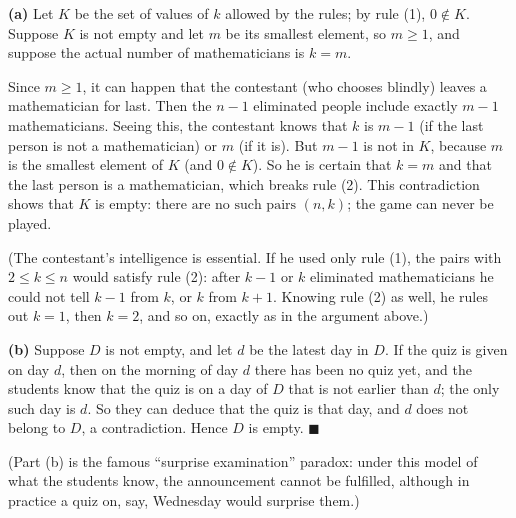 \textbf{(a)} Let $K$ be the set of values of $k$ allowed by the rules; by rule (1), $0\notin K$. Suppose $K$ is not empty and let $m$ be its smallest element, so $m\ge1$, and suppose the actual number of mathematicians is $k=m$.

Since $m\ge1$, it can happen that the contestant (who chooses blindly) leaves a mathematician for last. Then the $n-1$ eliminated people include exactly $m-1$ mathematicians. Seeing this, the contestant knows that $k$ is $m-1$ (if the last person is not a mathematician) or $m$ (if it is). But $m-1$ is not in $K$, because $m$ is the smallest element of $K$ (and $0\notin K$). So he is certain that $k=m$ and that the last person is a mathematician, which breaks rule (2). This contradiction shows that $K$ is empty: $\boxed{\text{there are no such pairs }(n,k)}$; the game can never be played.

(The contestant's intelligence is essential. If he used only rule (1), the pairs with $2\le k\le n$ would satisfy rule (2): after $k-1$ or $k$ eliminated mathematicians he could not tell $k-1$ from $k$, or $k$ from $k+1$. Knowing rule (2) as well, he rules out $k=1$, then $k=2$, and so on, exactly as in the argument above.)

\textbf{(b)} Suppose $D$ is not empty, and let $d$ be the latest day in $D$. If the quiz is given on day $d$, then on the morning of day $d$ there has been no quiz yet, and the students know that the quiz is on a day of $D$ that is not earlier than $d$; the only such day is $d$. So they can deduce that the quiz is that day, and $d$ does not belong to $D$, a contradiction. Hence $D$ is empty. $\blacksquare$

(Part (b) is the famous ``surprise examination'' paradox: under this model of what the students know, the announcement cannot be fulfilled, although in practice a quiz on, say, Wednesday would surprise them.)
